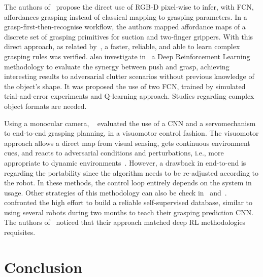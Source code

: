 

The authors of~\cite{Zeng2019} propose the direct use of RGB-D pixel-wise to infer, with \ac{FCN}, affordances grasping instead of classical mapping to grasping parameters. In a grasp-first-then-recognise workflow, the authors mapped affordance maps of a discrete set of grasping primitives for suction and two-finger grippers. With this direct approach, as related by~\cite{Zeng2019}, a faster, reliable, and able to learn complex grasping rules was verified. \citeauthor{Zeng2018} also investigate in~\cite{Zeng2018} a Deep Reinforcement Learning methodology to evaluate the synergy between push and grasp, achieving interesting results to adversarial clutter scenarios without previous knowledge of the object's shape. It was proposed the use of two \ac{FCN}, trained by simulated trial-and-error experiments and Q-learning approach. Studies regarding complex object formats are needed.

Using a monocular camera, \citeauthor{Levine2018}~\cite{Levine2018} evaluated the use of a \ac{CNN} and a servomechanism to end-to-end grasping planning, in a visuomotor control fashion. The visuomotor approach allows a direct map from visual sensing, gets continuous environment cues, and reacts to adversarial conditions and perturbations, i.e., more appropriate to dynamic environments~\cite{morrison2020learning}. However, a drawback in end-to-end is regarding the portability since the algorithm needs to be re-adjusted according to the robot. In these methods, the control loop entirely depends on the system in usage. Other strategies of this methodology can also be check in~\cite{james2017transferring} and~\cite{viereck2017learning}. \citeauthor{Levine2018}~\cite{Levine2018} confronted the high effort to build a reliable self-supervised database, similar to~\cite{Pinto2015} using several robots during two months to teach their grasping prediction \ac{CNN}. The authors of~\cite{Pinto2015,Levine2018} noticed that their approach matched deep \ac{RL} methodologies requisites. %

\section{Conclusion}
\label{cap2:related_work:sec:grasping_approaches:subsec:conclusion}

